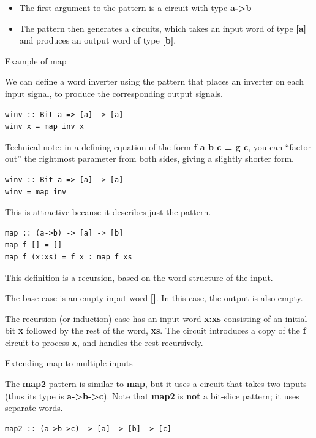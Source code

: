 \documentclass[]{svmono}
\begin{document}
\begin{itemize}
\item The first argument to the pattern is a circuit with type  \textbf{a->b}
\item The pattern then generates a circuits, which takes an input word of
type \textbf{{[}a]} and produces an output word of type \textbf{{[}b]}.
\end{itemize}

Example of map

We can define a word inverter using the pattern that places an
inverter on each input signal, to produce the corresponding output
signals.


\begin{verbatim}
winv :: Bit a => [a] -> [a]
winv x = map inv x
\end{verbatim}


Technical note: in a defining equation of the form \textbf{f a b c
  = g c}, you can ``factor out'' the rightmost parameter from both
sides, giving a slightly shorter form.


\begin{verbatim}
winv :: Bit a => [a] -> [a]
winv = map inv
\end{verbatim}

This is attractive because it describes just the pattern.


\begin{verbatim}
map :: (a->b) -> [a] -> [b]
map f [] = []
map f (x:xs) = f x : map f xs
\end{verbatim}


This definition is a recursion, based on the word structure of the
input.

The base case is an empty input word \textbf{{[}]}.  In this
case, the output is also empty.

The recursion (or induction) case has an input word \textbf{x:xs} consisting
of an initial bit \textbf{x} followed by the rest of the word, \textbf{xs}.  The
circuit introduces a copy of the \textbf{f} circuit to process \textbf{x}, and
handles the rest recursively.


Extending map to multiple inputs

The \textbf{map2} pattern is similar to \textbf{map}, but it uses a
circuit that takes two inputs (thus its type is \textbf{a->b->c}).
Note that \textbf{map2} is \textbf{not} a bit-slice pattern; it uses
separate words.


\begin{verbatim}
map2 :: (a->b->c) -> [a] -> [b] -> [c]
\end{verbatim}
\end{document}
